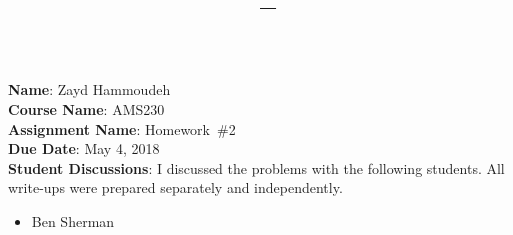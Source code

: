 \documentclass{report}
\title{\textbf{\course\ -- \assnName}}
\author{\name}
\newcommand{\course}{AMS230}
\newcommand{\assnName}{Homework~\#2}
\begin{document}
  \maketitle

  \noindent
  \textbf{Name}: Zayd Hammoudeh \\
  \textbf{Course Name}: \course \\
  \textbf{Assignment Name}: \assnName \\
  \textbf{Due Date}: May 4, 2018 \\
  \textbf{Student Discussions}: I discussed the problems with the following students.  All write-ups were prepared separately and independently. \\
  \vspace{-2.5em}
  \begin{itemize}
    \item Ben Sherman
  \end{itemize}

  \newpage
  

  \newpage
  

  \newpage
  

  \newpage
  
\end{document}
